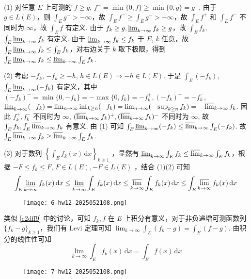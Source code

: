 (1) 对任意 $E$ 上可测的 $f\geq g$, $f^{-}=\min\{ 0,f \}\geq \min\{ 0,g \}=g^{-}$, 由于 $g\in L(E)$，则 $\int_{E}^{} g^{-}>-\infty$，故 $\int_{E}f^{-}\geq \int_{E}g^{-}>-\infty$，故 $\int_{E}f^{+}$ 和 $\int_{E}f^{-}$ 不同时为 $\infty$，故 $\int _Ef$ 有定义. 由于 $f_k\geq g,\varliminf_{ k \to \infty }f_k\geq g$，故 $\int_{E}f_k$, $\int_{E}\varliminf_{ k \to \infty }f_k$ 有定义. 由于 $\varliminf_{ k \to \infty }f_k\leq f_k$ 于 $E$, $k$ 任意，故 $\int_{E}\varliminf_{ k \to \infty }f_k\leq \int_{E}f_k$，对右边关于 $k$ 取下极限，得到 $\int _E\varliminf_{ k \to \infty }f_k\leq \varliminf_{ k \to \infty }\int_{E}f_k$.

(2) 考虑 $-f_k$, $-f_k\geq-h$, $h\in L (E)\Rightarrow -h\in L(E)$. 于是 $\int_{E}(-f_k)$, $\int_{E}\varliminf_{ k \to \infty }(-f_k)$ 有定义，其中 $(-f_k)^{-}=\min\{ 0,-f_k \}=-\max\{ 0, f_k \}=-f_k^{+}, (-f_k)^{+}=-f_k^{-}$, $\varliminf_{ k \to \infty }(-f_k)=\lim_{ n \to \infty }\inf_{k\geq n}(-f_k)=\lim_{ n \to \infty }(-\sup_{k\geq n}f_k)=-\varlimsup_{ k \to \infty }f_k$. 因此 $f_k^{+},f_k^{-}$ 不同时为 $\infty$, $(\varlimsup_{ k \to \infty }f_k)^{+},(\varlimsup_{ k \to \infty }f_k)^{-}$ 不同时为 $\infty$, 故 $\int_{E}f_k,\int_{E}\varlimsup_{ k \to \infty }f_k$ 有意义. 由 (1) 可知 $\int_{E}\varliminf_{ k \to \infty }(-f_k)\leq \varlimsup_{ k \to \infty } \int _E(-f_k)$. 故
$\int_{E}\varlimsup_{ k \to \infty }f_k\geq \varlimsup_{k\to \infty}\int_{E}f_k$.

(3) 对于数列 $\left\{  \int_{E}^{} f_k(x) \, \mathrm{d}x  \right\}_{k\geq1}$ ，显然有 $\varliminf_{ k \to \infty }\int_{E}f_k\leq \varlimsup_{ k \to \infty }\int_{E}f_k$，根据 $-F\leq f_k\leq F$, $F\in L (E),-F\in L(E)$ ，结合 (1)(2) 可知
\[
\int_{E}^{} \varliminf_{ k \to \infty } f_k(x) \, \mathrm{d}x \leq \varliminf_{ k \to \infty } \int_{E}^{} f_k(x) \, \mathrm{d}x \leq \varlimsup_{ k \to \infty } \int_{E}^{} f_k(x) \, \mathrm{d}x \leq \int_{E}^{} \varlimsup_{ k \to \infty } f_k(x) \, \mathrm{d}x
\]
\begin{exercise}
\begin{figure}[H]
\centering
\texttt{[image: 6-hw12-2025052108.png]}
\label{}
\end{figure}
\end{exercise}
类似 \cref{c2dff9} 中的讨论，可知 $f_k,f$ 在 $E$ 上积分有意义，对于非负递增可测函数列 $\{ f_k-g \}_{k\geq1}$，我们有 Levi 定理可知 $\lim_{ k \to \infty }\int_{E}^{} (f_k-g)=\int_{E}(f-g)$. 由积分的线性性可知
\[
\lim_{ k \to \infty } \int_{E}^{} f_k(x) \, \mathrm{d}x =\int_{E}^{} f(x) \, \mathrm{d}x
\]
\begin{exercise}
\begin{figure}[H]
\centering
\texttt{[image: 7-hw12-2025052108.png]}
\label{}
\end{figure}\label{1fa9d0}
\end{exercise}


